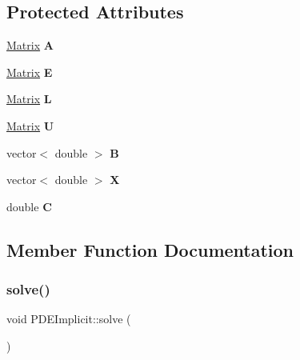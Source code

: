 \subsection*{Protected Attributes}
\begin{DoxyCompactItemize}
\item 
\mbox{\label{class_p_d_e_implicit_a43137099658d7cfa6d40f0c5d526c50b}} 
\hyperlink{class_matrix}{Matrix} {\bfseries A}
\item 
\mbox{\label{class_p_d_e_implicit_a067558d8aa140e0826c66a890a05b63b}} 
\hyperlink{class_matrix}{Matrix} {\bfseries E}
\item 
\mbox{\label{class_p_d_e_implicit_a3cf6ba9c1ae64074e79328d3ecfe1f7d}} 
\hyperlink{class_matrix}{Matrix} {\bfseries L}
\item 
\mbox{\label{class_p_d_e_implicit_a3c1dabd8717d8c560fa69d6838952351}} 
\hyperlink{class_matrix}{Matrix} {\bfseries U}
\item 
\mbox{\label{class_p_d_e_implicit_a787825cb4daaca9b90787e612e8aa5fa}} 
vector$<$ double $>$ {\bfseries B}
\item 
\mbox{\label{class_p_d_e_implicit_a5f6932af52db54b561af048bad266d52}} 
vector$<$ double $>$ {\bfseries X}
\item 
\mbox{\label{class_p_d_e_implicit_a977f4b0e57f031fb7e1a0dd13445822d}} 
double {\bfseries C}
\end{DoxyCompactItemize}


\subsection{Member Function Documentation}
\mbox{\label{class_p_d_e_implicit_ace06b1a56c2766ca8d4bc95669d21d12}} 
\subsubsection{\texorpdfstring{solve()}{solve()}}
{\footnotesize\ttfamily void P\+D\+E\+Implicit\+::solve (\begin{DoxyParamCaption}{ }\end{DoxyParamCaption})\hspace{0.3cm}{\ttfamily [virtual]}}

